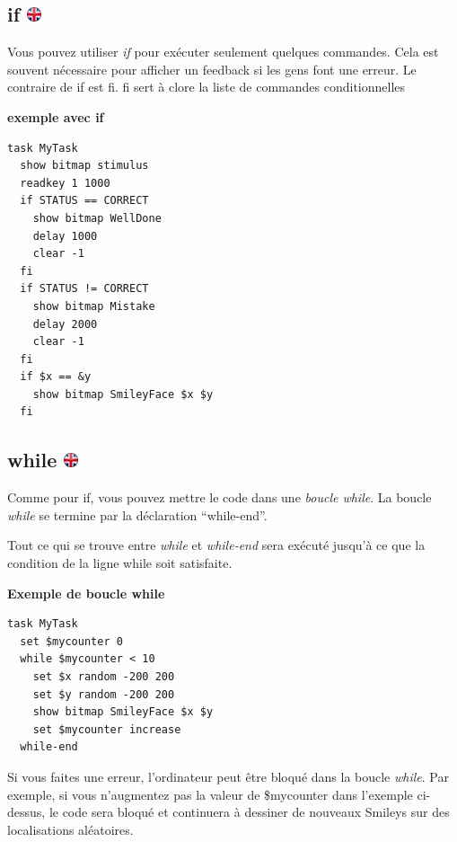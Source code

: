 \documentclass[
]{book}
\begin{document}
\hypertarget{if}{%
\subsection[if ]{\texorpdfstring{if
\href{https://www.psytoolkit.org/doc3.2.0/syntax.html\#task-if}{\protect\includegraphics{img/ukflag.png}}}{if }}\label{if}}

Vous pouvez utiliser \emph{if} pour exécuter seulement quelques
commandes. Cela est souvent nécessaire pour afficher un feedback si les
gens font une erreur. Le contraire de if est fi. fi sert à clore la
liste de commandes conditionnelles

\textbf{exemple avec if}

\begin{verbatim}
task MyTask
  show bitmap stimulus
  readkey 1 1000
  if STATUS == CORRECT
    show bitmap WellDone
    delay 1000
    clear -1
  fi
  if STATUS != CORRECT
    show bitmap Mistake
    delay 2000
    clear -1
  fi
  if $x == &y
    show bitmap SmileyFace $x $y
  fi
\end{verbatim}

\hypertarget{while}{%
\subsection[while ]{\texorpdfstring{while
\href{https://www.psytoolkit.org/doc3.2.0/syntax.html\#task-while}{\protect\includegraphics{img/ukflag.png}}}{while }}\label{while}}

Comme pour if, vous pouvez mettre le code dans une \emph{boucle while}.
La boucle \emph{while} se termine par la déclaration ``while-end''.

Tout ce qui se trouve entre \emph{while} et \emph{while-end} sera
exécuté jusqu'à ce que la condition de la ligne while soit satisfaite.

\textbf{Exemple de boucle while}

\begin{verbatim}
task MyTask
  set $mycounter 0
  while $mycounter < 10
    set $x random -200 200
    set $y random -200 200
    show bitmap SmileyFace $x $y
    set $mycounter increase
  while-end
\end{verbatim}

Si vous faites une erreur, l'ordinateur peut être bloqué dans la boucle
\emph{while}. Par exemple, si vous n'augmentez pas la valeur de
\$mycounter dans l'exemple ci-dessus, le code sera bloqué et continuera
à dessiner de nouveaux Smileys sur des localisations aléatoires.
\end{document}
